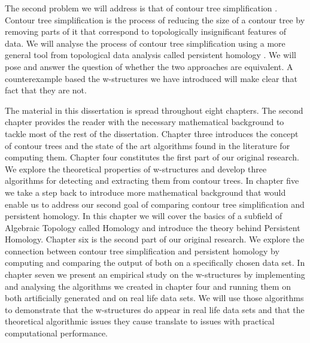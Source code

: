 The second problem we will address is that of contour tree simplification \cite{ct-branch-decomp}. Contour tree simplification is the process of reducing the size of a contour tree by removing parts of it that correspond to topologically insignificant  features of data. We will analyse the process of contour tree simplification using a more general tool from topological data analysis called persistent homology \cite{ph-a-survey}. We will pose and answer the question of whether the two approaches are equivalent. A counterexample based the w-structures we have introduced will make clear that fact that they are not.


The material in this dissertation is spread throughout eight chapters. The second chapter provides the reader with the necessary mathematical background to tackle most of the rest of the dissertation. Chapter three introduces the concept of contour trees and the state of the art algorithms found in the literature for computing them. Chapter four constitutes the first part of our original research. We explore the theoretical properties of w-structures and develop three algorithms for detecting and extracting them from contour trees. In chapter five we take a step back to introduce more mathematical background that would enable us to address our second goal of comparing contour tree simplification and persistent homology. In this chapter we will cover the basics of a subfield of Algebraic Topology called Homology and introduce the theory behind Persistent Homology. Chapter six is the second part of our original research. We explore the connection between contour tree simplification and persistent homology by computing and comparing the output of both on a specifically chosen data set. In chapter seven we present an empirical study on the w-structures by implementing and analysing the algorithms we created in chapter four and running them on both artificially generated and on real life data sets. We will use those algorithms to demonstrate that the w-structures do appear in real life data sets and that the theoretical algorithmic issues they cause translate to issues with practical computational performance.
